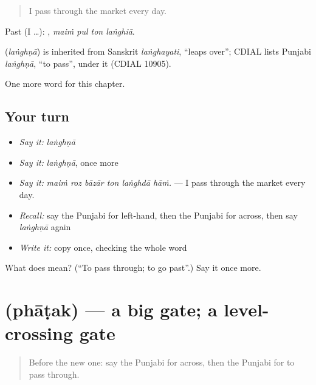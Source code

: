 \begin{quote}
I pass through the market every day.
\end{quote}

Past (I …):    , \emph{maiṁ pul ton laṅghiā}.

\begin{cousinweb}
\textbf{} (\emph{laṅghṇā}) is inherited from Sanskrit \emph{laṅghayati}, \textquotedblleft{}leaps over\textquotedblright{}; CDIAL lists Punjabi \emph{laṅghṇā}, \textquotedblleft{}to pass\textquotedblright{}, under it (CDIAL 10905).
\end{cousinweb}

\begin{grammarlens}[title={What you've built}]
One more word for this chapter.
\end{grammarlens}

\subsection*{Your turn}
\begin{itemize}
\raggedright
  \item \emph{Say it:} \emph{laṅghṇā}
  \item \emph{Say it:} \emph{laṅghṇā}, once more
  \item \emph{Say it:} \emph{maiṁ roz bāzār ton laṅghdā hāṁ.} — I pass through the market every day.
  \item \emph{Recall:} say the Punjabi for left-hand, then the Punjabi for across, then say \emph{laṅghṇā} again
  \item \emph{Write it:} copy \textbf{} once, checking the whole word
\end{itemize}

\begin{tcolorbox}[breakable,colback=teal!4,colframe=teal!35!black,title={Before you move on}]
What does  mean? (\textquotedblleft{}To pass through; to go past\textquotedblright{}.) Say it once more.
\end{tcolorbox}
\section[\texorpdfstring{\pa{ਫਾਟਕ} (phāṭak)}{ਫਾਟਕ (phāṭak)}]{ (phāṭak) — a big gate; a level-crossing gate}

\label{lesson:PA-C264-phatak}



\begin{quote}
Before the new one: say the Punjabi for across, then the Punjabi for to pass through.
\end{quote}

